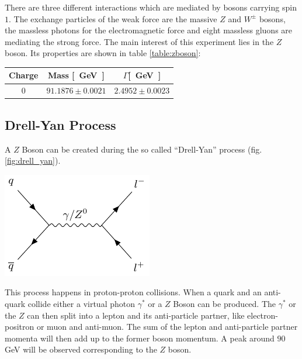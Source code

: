 \documentclass[12pt, a4paper, bibliography=totoc]{scrartcl}
\begin{document}
\begin{multicols}{2}
There are three different interactions which are mediated by bosons carrying spin $1$.
The exchange particles of the weak force are the massive $Z$ and $W^{\pm}$ bosons, the massless photons for the electromagnetic force and eight massless gluons are mediating the strong force. 
The main interest of this experiment lies in the $Z$ boson.
Its properties are shown in table \ref{table:zboson}:
        \begin{center}
            \begin{tabular*}{\linewidth}{c c c}
        \toprule
                Charge & Mass \si{[GeV]} & $\Gamma$\si{[GeV]}\\%
        \midrule
                \small{0} & \small {$91.1876 \pm 0.0021$} & \small{$2.4952 \pm 0.0023$} \\
        \bottomrule
    \end{tabular*}
        \label{table:zboson}
        \end{center}


\subsection{Drell-Yan Process}
A $Z$ Boson can be created during the so called ``Drell-Yan'' process (fig. \ref{fig:drell_yan}). 

    \begin{center}
\includegraphics[width=0.55\linewidth]{fig/feynman_0.pdf}
\label{fig:drell_yan}
\end{center}

This process happens in proton-proton collisions.
When a quark and an anti-quark collide either a virtual photon $\gamma^\ast$ or a $Z$ Boson can be produced. 
The $\gamma^\ast$ or the $Z$ can then split into a lepton and its anti-particle partner, like electron-positron or muon and anti-muon.
The sum of the lepton and anti-particle partner momenta will then add up to the former boson momentum. 
A peak around $90$ \si{GeV} will be observed corresponding to the $Z$ boson. 


\end{multicols}
\end{document}

